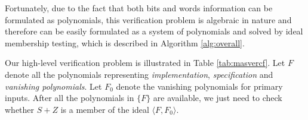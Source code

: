Fortunately, due to the fact that both bits and words information can be formulated as polynomials,
this verification problem is algebraic in nature and therefore 
can be easily formulated as a system of polynomials and solved by ideal membership testing,
which is described in Algorithm \ref{alg:overall}.

\begin{Example}
		
	Our high-level verification problem is illustrated in Table \ref{tab:masvercf}. 
	Let $F$ denote all the polynomials representing {\it implementation}, {\it specification} and {\it vanishing polynomials}.
	Let $F_0$ denote the vanishing polynomials for primary inputs.
	After all the polynomials in $\{F\}$ are available, 
	we just need to check whether $S+Z$ is a member of the ideal $\langle F,F_0\rangle$.
	

\end{Example}
